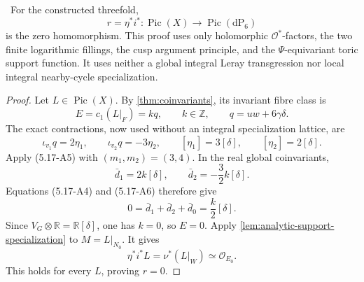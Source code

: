 \begin{theorem}
\label{thm:analytic-all-picard}
\Verified\ For the constructed threefold,
\[
 r=\eta^*i^*:\operatorname{Pic}(X)\longrightarrow
 \operatorname{Pic}(\mathrm{dP}_6)
\]
is the zero homomorphism.  This proof uses only holomorphic
\(\mathcal O^*\)-factors, the two finite logarithmic fillings, the cusp
argument principle, and the \(\Psi\)-equivariant toric support function.
It uses neither a global integral Leray transgression nor local integral
nearby-cycle specialization.
\end{theorem}

\begin{proof}
Let \(L\in\operatorname{Pic}(X)\).  By
\cref{thm:coinvariants}, its invariant fibre class is
\[
 E=c_1(L|_F)=kq,
 \qquad k\in\mathbb Z,
 \qquad q=uw+6\gamma\delta.
\tag{5.17-A35}
\]
The exact contractions, now used without an integral specialization
lattice, are
\[
 \iota_{v_1}q=2\eta_1,
 \qquad
 \iota_{v_2}q=-3\eta_2,
 \qquad
 [\eta_1]=3[\delta],
 \qquad
 [\eta_2]=2[\delta].
\tag{5.17-A36}
\]
Apply (5.17-A5) with \((m_1,m_2)=(3,4)\).  In the real global
coinvariants,
\[
 \bar d_1=2k[\delta],
 \qquad
 \bar d_2=-\frac32k[\delta].
\tag{5.17-A37}
\]
Equations (5.17-A4) and (5.17-A6) therefore give
\[
 0=\bar d_1+\bar d_2+\bar d_0
   =\frac{k}{2}[\delta].
\tag{5.17-A38}
\]
Since \(V_G\otimes\mathbb R=\mathbb R[\delta]\), one has \(k=0\), so
\(E=0\).  Apply \cref{lem:analytic-support-specialization} to
\(M=L|_{N_0}\).  It gives
\[
 \eta^*i^*L=\nu^*(L|_W)\simeq\mathcal O_{E_0}.
\]
This holds for every \(L\), proving \(r=0\).
\end{proof}
